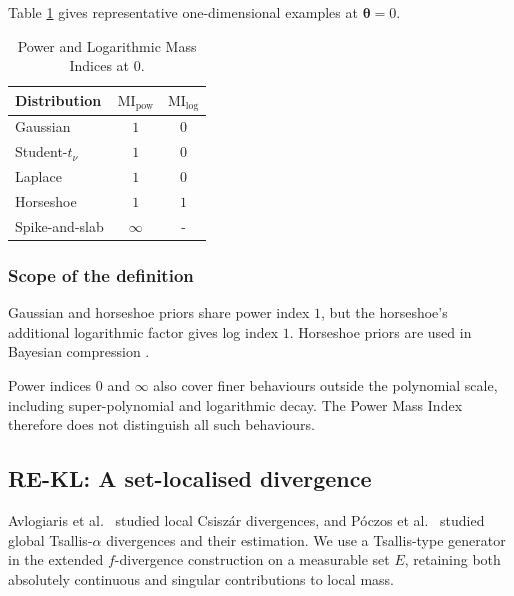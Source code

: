 \documentclass[11pt,a4paper]{article}
\newcommand{\MI}{\mathrm{MI}}
\newcommand{\pa}{\boldsymbol\theta}
\theoremstyle{compactplain}
\theoremstyle{compactdefinition}
\numberwithin{equation}{section}
\begin{document}
Table \ref{table:MI-common} gives representative one-dimensional examples at \(\pa=0\).

\begin{table}[t]
\centering
\caption{Power and Logarithmic Mass Indices at $0$.}
\label{table:MI-common}
\setlength{\tabcolsep}{4pt}
\renewcommand{\arraystretch}{1.15}
\begin{tabular}{@{}lcc@{}}
\hline
\textbf{Distribution}
& \(\MI_{\mathrm{pow}}\)
& \(\MI_{\mathrm{log}}\) \\
\hline
Gaussian
& \(1\) & \(0\) \\

Student-\(t_\nu\) 
& \(1\) & \(0\) \\

Laplace
& \(1\) & \(0\) \\

Horseshoe
& \(1\) & \(1\) \\

Spike-and-slab
& \(\infty\) & - \\
\hline
\end{tabular}
\end{table}

\subsubsection{Scope of the definition}


Gaussian and horseshoe priors share power index \(1\), but the horseshoe's additional logarithmic factor gives log index \(1\). Horseshoe priors are used in Bayesian compression \cite{ghosh_model_nodate}.

Power indices \(0\) and \(\infty\) also cover finer behaviours outside the polynomial scale, including super-polynomial and logarithmic decay. The Power Mass Index therefore does not distinguish all such behaviours.

\subsection{RE-KL: A set-localised divergence}

\label{subsec:rekl}

Avlogiaris et al.\ \cite{avlogiaris2016local} studied local Csisz\'ar divergences, and P\'oczos et al.\ \cite{poczos2011estimation} studied global Tsallis-\(\alpha\) divergences and their estimation. We use a Tsallis-type generator in the extended \(f\)-divergence construction on a measurable set \(E\), retaining both absolutely continuous and singular contributions to local mass.
\end{document}
